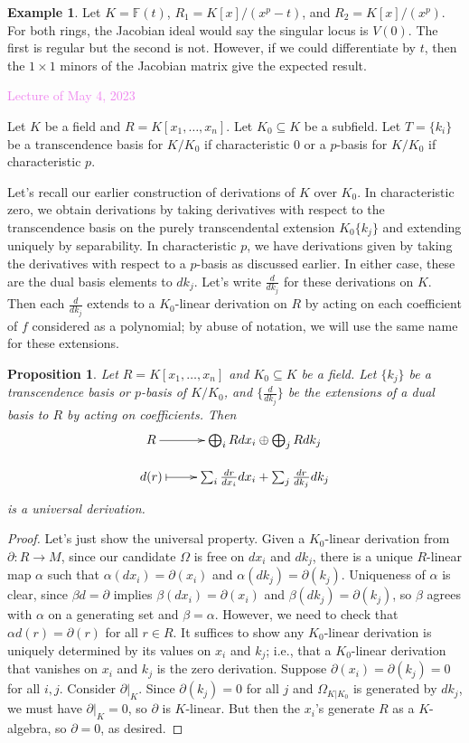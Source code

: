 \documentclass{amsart}[12pt]
\newcommand{\May}[1]{\textcolor{violet}{Lecture of May #1, 2023}}
\newcommand{\F}{\mathbb{F}}
\numberwithin{equation}{section}
\theoremstyle{plain} %
\newtheorem{prop}[equation]{Proposition}
\theoremstyle{definition}
\newtheorem{ex}[equation]{Example}
\theoremstyle{remark}
\begin{document}
\begin{ex}
 Let $K=\F(t)$, $R_1=K[x]/(x^p-t)$, and $R_2=K[x]/(x^p)$. For both rings, the Jacobian ideal would say the singular locus is $V(0)$. The first is regular but the second is not.
However, if we could differentiate by $t$, then the $1\times 1$ minors of the Jacobian matrix give the expected result.
\end{ex}

\May{4}

Let $K$ be a field and $R=K[x_1,\dots,x_n]$. Let $K_0\subseteq K$ be a subfield. Let $T= \{k_i\}$ be a transcendence basis for $K/K_0$ if characteristic 0 or a $p$-basis for $K/K_0$ if characteristic $p$. 

 
Let's recall our earlier construction of derivations of $K$ over $K_0$.
In characteristic zero, we obtain derivations by taking derivatives with respect to the transcendence basis on the purely transcendental extension $K_0\{k_j\}$ and extending uniquely by separability. In characteristic $p$, we have derivations given by taking the derivatives with respect to a $p$-basis as discussed earlier. In either case, these are the dual basis elements to $dk_j$. Let's write $\frac{d}{dk_j}$ for these derivations on $K$. Then each $\frac{d}{dk_j}$ extends to a $K_0$-linear derivation on $R$ by acting on each coefficient of $f$ considered as a polynomial; by abuse of notation, we will use the same name for these extensions. 
 
 \begin{prop} Let $R=K[x_1,\dots,x_n]$ and $K_0\subseteq K$ be a field. Let $\{ k_j\}$ be a transcendence basis or $p$-basis of $K/K_0$, and $\{\frac{d}{dk_j}\}$ be the extensions of a dual basis to $R$ by acting on coefficients. Then
 \[ \xymatrix@R=1em{ R \ar[r] & \bigoplus_i R dx_i \oplus \bigoplus_j R dk_j\\
  d(r) \ar@{|->}[r] & \sum_i \frac{dr}{dx_i} dx_i + \sum_j \frac{dr}{dk_j} dk_j}\]
 is a universal derivation.
 \end{prop}
 \begin{proof} Let's just show the universal property. Given a $K_0$-linear derivation from $\partial: R\to M$,  since our candidate $\Omega$ is free on $dx_i$ and $dk_j$, there is a unique $R$-linear map $\alpha$ such that
 $\alpha(dx_i) = \partial(x_i)$ and $\alpha(dk_j) = \partial(k_j)$. Uniqueness of $\alpha$ is clear, since $\beta d = \partial$ implies $\beta(dx_i) = \partial(x_i)$ and $\beta(dk_j)=\partial(k_j)$, so $\beta$ agrees with $\alpha$ on a generating set and $\beta=\alpha$. However, we need to check that $\alpha d(r) = \partial(r)$ for all $r\in R$. It suffices to show  any $K_0$-linear derivation is uniquely determined by its values on $x_i$ and $k_j$; i.e., that a $K_0$-linear derivation that vanishes on $x_i$ and $k_j$ is the zero derivation. Suppose $\partial(x_i)=\partial(k_j)=0$ for all $i,j$. Consider $\partial|_{K}$. Since $\partial(k_j)=0$ for all $j$ and $\Omega_{K|K_0}$ is generated by $dk_j$, we must have $\partial|_K=0$, so $\partial$ is $K$-linear. But then the $x_i$'s generate $R$ as a $K$-algebra, so $\partial=0$, as desired.
 \end{proof}
 
\end{document}
